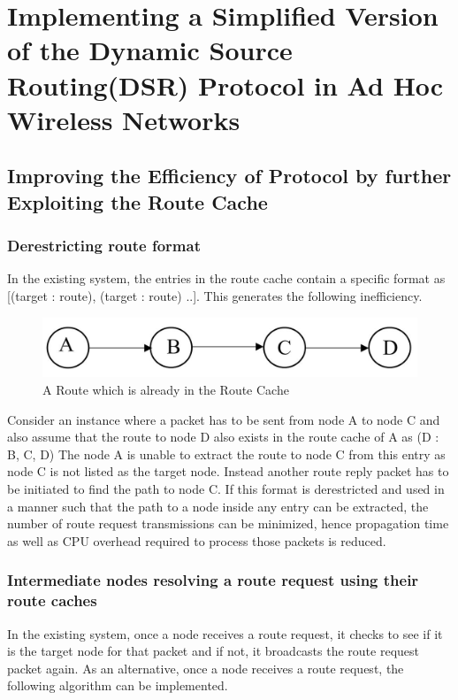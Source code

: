 \documentclass[a4paper,11pt]{article}%
\begin{document}

\vfill
\pagebreak


\section{Implementing a Simplified Version of the Dynamic Source Routing(DSR) Protocol in Ad Hoc Wireless Networks}

\subsection{Improving the Efficiency of Protocol by further Exploiting the Route Cache}

\subsubsection{Derestricting route format}
In the existing system, the entries in the route cache contain a specific format as [(target : route), (target : route) ..].
This generates the following inefficiency.
\begin{figure}[!h]
	\centering
	\includegraphics[scale = 0.4]{figures/route}
	\caption{A Route which is already in the Route Cache}
\end{figure}

Consider an instance where a packet has to be sent from node A to node C and also assume that the route to node D also exists in the route cache of A as (D : B, C, D)
The node A is unable to extract the route to node C from this entry as node C is not listed as the target node. Instead another route reply packet has to be initiated to find the path to node C.
If this format is derestricted and used in a manner such that the path to a node inside any entry can be extracted, the number of route request transmissions can be minimized, hence propagation time as well as CPU overhead required to process those packets is reduced.

\subsubsection{Intermediate nodes resolving a route request using their route caches}
In the existing system, once a node receives a route request, it checks to see if it is the target node for that packet and if not, it broadcasts the route request packet again.
As an alternative, once a node receives a route request, the following algorithm can be implemented.
\end{document}
